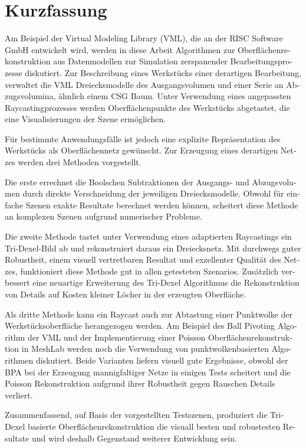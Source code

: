 \chapter*{Kurzfassung}

\begin{otherlanguage}{ngerman}
	Am Beispiel der Virtual Modeling Library (VML), die an der RISC Software GmbH entwickelt wird, werden in diese Arbeit Algorithmen zur Oberflächenrekonstruktion aus Datenmodellen zur Simulation zerspanender Bearbeitungsprozesse diskutiert.
	Zur Beschreibung eines Werkstücks einer derartigen Bearbeitung, verwaltet die VML Dreiecksmodelle des Ausgangsvolumen und einer Serie an Abzugsvolumina, ähnlich einem CSG Baum.
	Unter Verwendung eines angepassten Raycastingprozesses werden Oberflächenpunkte des Werkstücks abgetastet, die eine Visualisierungen der Szene ermöglichen.

	Für bestimmte Anwendungsfälle ist jedoch eine explizite Repräsentation des Werkstücks als Oberflächennetz gewünscht.
	Zur Erzeugung eines derartigen Netzes werden drei Methoden vorgestellt.

	Die erste errechnet die Boolschen Subtraktionen der Ausgangs- und Abzugsvolumen durch direkte Verschneidung der jeweiligen Dreiecksmodelle.
	Obwohl für einfache Szenen exakte Resultate berechnet werden können, scheitert diese Methode an komplexen Szenen aufgrund numerischer Probleme.

	Die zweite Methode tastet unter Verwendung eines adaptierten Raycastings ein Tri-Dexel-Bild ab und rekonstruiert daraus ein Dreiecksnetz.
	Mit durchwegs guter Robustheit, einem visuell vertretbaren Resultat und exzellenter Qualität des Netzes, funktioniert diese Methode gut in allen getesteten Szenarios.
	Zusätzlich verbessert eine neuartige Erweiterung des Tri-Dexel Algorithmus die Rekonstruktion von Details auf Kosten kleiner Löcher in der erzeugten Oberfläche.

	Als dritte Methode kann ein Raycast auch zur Abtastung einer Punktwolke der Werkstücksoberfläche herangezogen werden.
	Am Beispiel des Ball Pivoting Algorithm der VML und der Implementierung einer Poisson Oberflächenrekonstruktion in MeshLab werden noch die Verwendung von punktwolkenbasierten Algorithmen diskutiert.
	Beide Varianten liefern visuell gute Ergebnisse, obwohl der BPA bei der Erzeugung mannigfaltiger Netze in einigen Tests scheitert und die Poisson Rekonstruktion aufgrund ihrer Robustheit gegen Rauschen Details verliert.

	Zusammenfassend, auf Basis der vorgestellten Testszenen, produziert die Tri-Dexel basierte Oberflächenrekonstruktion die visuall besten und robustesten Resultate und wird deshalb Gegenstand weiterer Entwicklung sein.
\end{otherlanguage}

